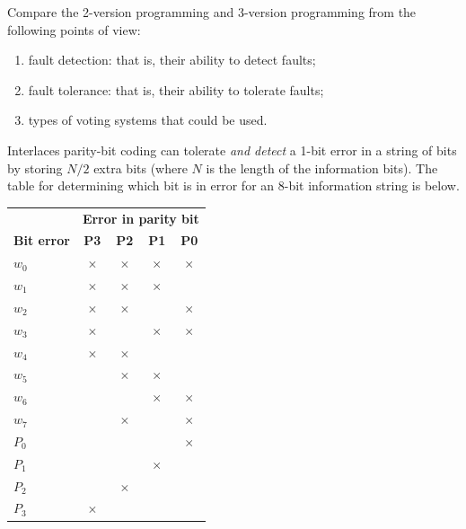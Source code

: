 Compare the 2-version programming and 3-version programming from the following points of view: 

\begin{enumerate}

 \item fault detection: that is, their ability to detect faults;

 \item fault tolerance: that is, their ability to tolerate faults;

 \item types of voting systems that could be used.

\end{enumerate}



Interlaces parity-bit coding can tolerate \emph{and detect} a 1-bit error in a string of bits by storing $N/2$ extra bits (where $N$ is the length of the information bits). The table for determining which bit is in error for an 8-bit information string is below.

\begin{center}
\begin{tabular}{lcccc}
 \toprule
     & \multicolumn{4}{l}{\textbf{Error in parity bit}}\\
     \cmidrule{2-5}
 \textbf{Bit error} & \textbf{P3} & \textbf{P2} & \textbf{P1} & \textbf{P0}\\
 \midrule
  $w_0$ & $\times$ & $\times$ & $\times$ & $\times$\\
  $w_1$ & $\times$ & $\times$ & $\times$ &         \\
  $w_2$ & $\times$ & $\times$ &          & $\times$\\
  $w_3$ & $\times$ &          & $\times$ & $\times$\\
  $w_4$ & $\times$ & $\times$ &          &         \\
  $w_5$ &          & $\times$ & $\times$ &         \\
  $w_6$ &          &          & $\times$ & $\times$\\
  $w_7$ &          & $\times$ &          & $\times$\\
  $P_0$ &          &          &          & $\times$\\
  $P_1$ &          &          & $\times$ &         \\
  $P_2$ &          & $\times$ &          &         \\
  $P_3$ & $\times$ &          &          &         \\
 \bottomrule
\end{tabular}
\end{center}


